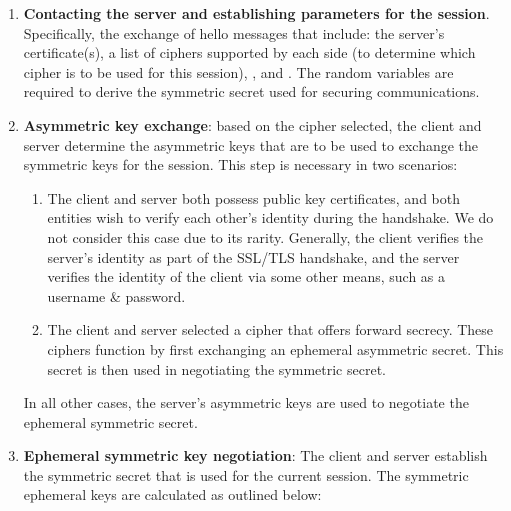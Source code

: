 \documentclass[../main.tex]{subfiles}
\begin{document}
\begin{enumerate}
  \item \textbf{Contacting the server and establishing parameters for
    the session}. Specifically, the exchange of hello messages that
    include: the server's certificate(s), a list of ciphers supported by
    each side (to determine which cipher is to be used for this session),
    \srandom, and \crandom. The random variables are required to derive the
    symmetric secret used for securing communications.
  \item \textbf{Asymmetric key exchange}: based on the cipher
    selected, the client and server determine the asymmetric keys that are
    to be used to exchange the symmetric keys for the session. This step
    is necessary in two scenarios:
    \begin{enumerate}
      \item The client and server both possess public key
        certificates, and both entities wish to verify each other's identity
        during the handshake. We do not consider this case due to its
        rarity. Generally, the client verifies the server's identity as part
        of the SSL/TLS handshake, and the server verifies the identity of the
        client via some other means, such as a username \& password.
      \item The client and server selected a cipher that offers
        forward secrecy. These ciphers function by first exchanging an
        ephemeral asymmetric secret. This secret is then used in negotiating
        the symmetric secret.
    \end{enumerate} In all other cases, the server's asymmetric keys
    are used to negotiate the ephemeral symmetric secret.
  \item \textbf{Ephemeral symmetric key negotiation}: The client and
    server establish the symmetric secret that is used for the current
    session. The symmetric ephemeral keys are calculated as outlined
    below:


\end{enumerate}
\end{document}
